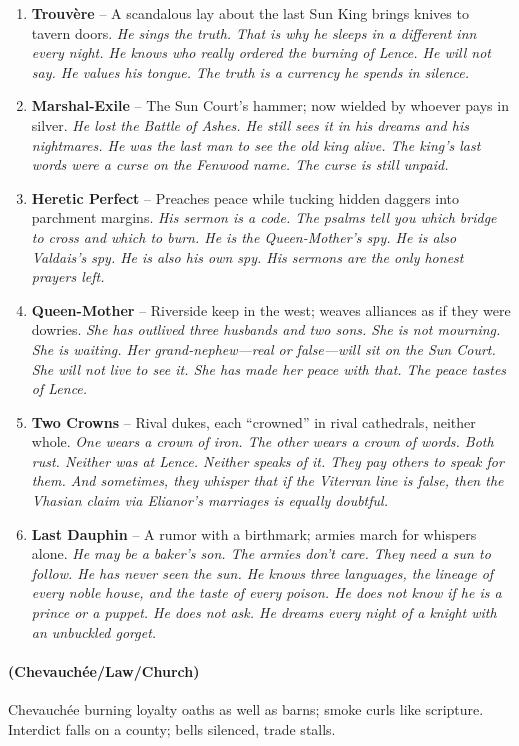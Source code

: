 \begin{enumerate}
\item \textbf{Trouvère} -- A scandalous lay about the last Sun King brings knives to tavern doors.
  \hfill \textit{He sings the truth. That is why he sleeps in a different inn every night. He knows who really ordered the burning of Lence. He will not say. He values his tongue. The truth is a currency he spends in silence.}
\item \textbf{Marshal-Exile} -- The Sun Court's hammer; now wielded by whoever pays in silver.
  \hfill \textit{He lost the Battle of Ashes. He still sees it in his dreams and his nightmares. He was the last man to see the old king alive. The king's last words were a curse on the Fenwood name. The curse is still unpaid.}
\item[J] \textbf{Heretic Perfect} -- Preaches peace while tucking hidden daggers into parchment margins.
  \hfill \textit{His sermon is a code. The psalms tell you which bridge to cross and which to burn. He is the Queen-Mother's spy. He is also Valdais's spy. He is also his own spy. His sermons are the only honest prayers left.}
\item[Q] \textbf{Queen-Mother} -- Riverside keep in the west; weaves alliances as if they were dowries.
  \hfill \textit{She has outlived three husbands and two sons. She is not mourning. She is waiting. Her grand-nephew---real or false---will sit on the Sun Court. She will not live to see it. She has made her peace with that. The peace tastes of Lence.}
\item[K] \textbf{Two Crowns} -- Rival dukes, each ``crowned'' in rival cathedrals, neither whole.
  \hfill \textit{One wears a crown of iron. The other wears a crown of words. Both rust. Neither was at Lence. Neither speaks of it. They pay others to speak for them. And sometimes, they whisper that if the Viterran line is false, then the Vhasian claim via Elianor's marriages is equally doubtful.}
\item[A] \textbf{Last Dauphin} -- A rumor with a birthmark; armies march for whispers alone.
  \hfill \textit{He may be a baker's son. The armies don't care. They need a sun to follow. He has never seen the sun. He knows three languages, the lineage of every noble house, and the taste of every poison. He does not know if he is a prince or a puppet. He does not ask. He dreams every night of a knight with an unbuckled gorget.}
\end{enumerate}

\paragraph*{(Chevauchée/Law/Church)} Chevauchée burning loyalty oaths as well as barns; smoke curls like scripture. Interdict falls on a county; bells silenced, trade stalls.

